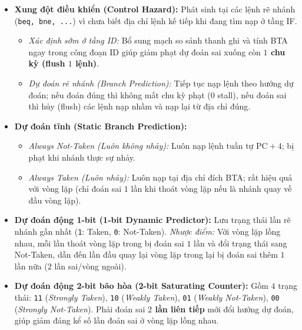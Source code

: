 \begin{itemize}
\begin{itemize}
    \end{itemize}
    \item \textbf{Xung đột điều khiển (Control Hazard):} Phát sinh tại các lệnh rẽ nhánh (\texttt{beq, bne, ...}) vì chưa biết địa chỉ lệnh kế tiếp khi đang tìm nạp ở tầng IF.
    \begin{itemize}
        \item \textit{Xác định sớm ở tầng ID:} Bổ sung mạch so sánh thanh ghi và tính BTA ngay trong công đoạn ID giúp giảm phạt dự đoán sai xuống còn \textbf{$1$ chu kỳ (flush $1$ lệnh)}.
        \item \textit{Dự đoán rẽ nhánh (Branch Prediction):} Tiếp tục nạp lệnh theo hướng dự đoán; nếu đoán đúng thì không mất chu kỳ phạt ($0$ stall), nếu đoán sai thì hủy (flush) các lệnh nạp nhầm và nạp lại từ địa chỉ đúng.
    \end{itemize}
\end{itemize}

\begin{tcolorbox}[bwbox, title={Các chiến lược Dự đoán rẽ nhánh (Static vs Dynamic 1-bit \& 2-bit)}]
\begin{itemize}
    \item \textbf{Dự đoán tĩnh (Static Branch Prediction):}
    \begin{itemize}
        \item \textit{Always Not-Taken (Luôn không nhảy):} Luôn nạp lệnh tuần tự $\text{PC} + 4$; bị phạt khi nhánh thực sự nhảy.
        \item \textit{Always Taken (Luôn nhảy):} Luôn nạp tại địa chỉ đích BTA; rất hiệu quả với vòng lặp (chỉ đoán sai $1$ lần khi thoát vòng lặp nếu là nhánh quay về đầu vòng lặp).
    \end{itemize}
    \item \textbf{Dự đoán động 1-bit (1-bit Dynamic Predictor):} Lưu trạng thái lần rẽ nhánh gần nhất (\texttt{1}: Taken, \texttt{0}: Not-Taken). \textit{Nhược điểm:} Với vòng lặp lồng nhau, mỗi lần thoát vòng lặp trong bị đoán sai $1$ lần và đổi trạng thái sang Not-Taken, dẫn đến lần đầu quay lại vòng lặp trong lại bị đoán sai thêm $1$ lần nữa ($2$ lần sai/vòng ngoài).
    \item \textbf{Dự đoán động 2-bit bão hòa (2-bit Saturating Counter):} Gồm $4$ trạng thái: \texttt{11} (\textit{Strongly Taken}), \texttt{10} (\textit{Weakly Taken}), \texttt{01} (\textit{Weakly Not-Taken}), \texttt{00} (\textit{Strongly Not-Taken}). Phải đoán sai \textbf{$2$ lần liên tiếp} mới đổi hướng dự đoán, giúp giảm đáng kể số lần đoán sai ở vòng lặp lồng nhau.
\end{itemize}
\end{tcolorbox}

